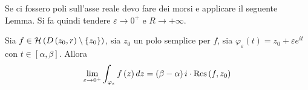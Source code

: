 Se ci fossero poli sull'asse reale devo fare dei morsi e applicare il seguente Lemma. Si fa quindi tendere $\varepsilon \rightarrow 0^{+}$ e $R\rightarrow + \infty $.
\begin{thm}
 Sia $f\in \Hc \left(D\left(z_{0}, r\right) \setminus \left\{z_{0}\right\}\right)$, sia $z_{0}$ un polo semplice per $f$, sia $\varphi_{\varepsilon}\left(t\right) = z_{0} + \varepsilon e^{it}$ con $t\in \left[ \alpha, \beta \right]$. Allora
\begin{equation*}
\lim_{\varepsilon \rightarrow 0^{+}}\int_{\varphi_{\varepsilon}} f\left(z\right) dz = \left(\beta - \alpha \right) i \cdot \Res \left(f, z_{0}\right)
\end{equation*}
\end{thm}
\begin{figure}[htpb]
	\centering
{} %

\begin{tikzpicture}[x = 0.75pt, y = 0.75pt, yscale = -1, xscale = 1]


\end{tikzpicture}
\end{figure}
